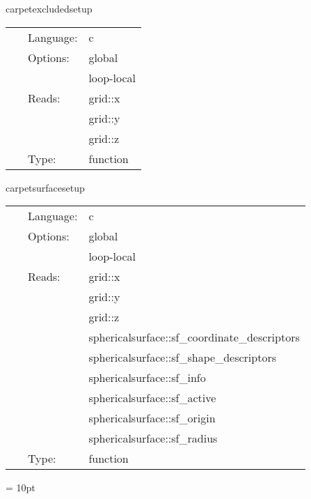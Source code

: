 \vspace{5mm}


\hspace{5mm} carpetexcludedsetup 

\hspace{5mm}{\it set up the weight function for the excluded regions } 


\hspace{5mm}

 \begin{tabular*}{160mm}{cll} 
~ & Language:  & c \\ 
~ & Options:  & global \\ 
~& ~ &loop-local\\ 
~ & Reads:  & grid::x \\ 
~& ~ &grid::y\\ 
~& ~ &grid::z\\ 
~ & Type:  & function \\ 
\end{tabular*} 


\vspace{5mm}


\hspace{5mm} carpetsurfacesetup 

\hspace{5mm}{\it set up the weight function for the excluded spherical surfaces } 


\hspace{5mm}

 \begin{tabular*}{160mm}{cll} 
~ & Language:  & c \\ 
~ & Options:  & global \\ 
~& ~ &loop-local\\ 
~ & Reads:  & grid::x \\ 
~& ~ &grid::y\\ 
~& ~ &grid::z\\ 
~& ~ &sphericalsurface::sf\_coordinate\_descriptors\\ 
~& ~ &sphericalsurface::sf\_shape\_descriptors\\ 
~& ~ &sphericalsurface::sf\_info\\ 
~& ~ &sphericalsurface::sf\_active\\ 
~& ~ &sphericalsurface::sf\_origin\\ 
~& ~ &sphericalsurface::sf\_radius\\ 
~ & Type:  & function \\ 
\end{tabular*} 



\vspace{5mm}\parskip = 10pt 

